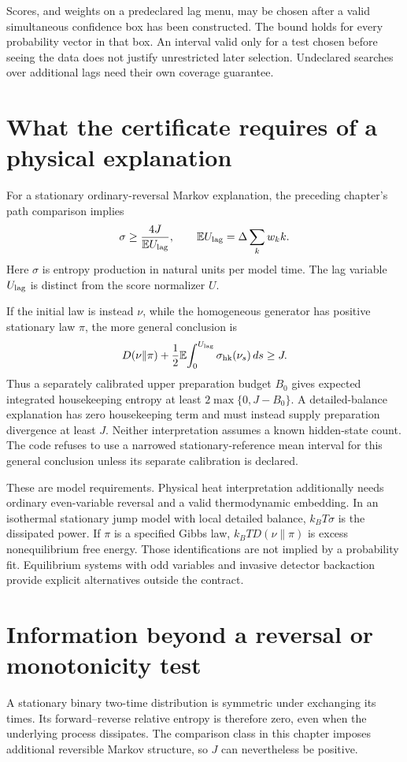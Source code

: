 Scores, and weights on a predeclared lag menu, may be chosen after a valid
simultaneous confidence box has been constructed. The bound holds for every
probability vector in that box. An interval valid only for a test chosen before
seeing the data does not justify unrestricted later selection. Undeclared
searches over additional lags need their own coverage guarantee.

\section{What the certificate requires of a physical explanation}
For a stationary ordinary-reversal Markov explanation, the preceding chapter's
path comparison implies
\begin{equation}
 \sigma\geq\frac{4J}{\mathbb E U_{\rm lag}},\qquad
 \mathbb E U_{\rm lag}=\Delta\sum_k w_k k.
 \label{rf:dual-rate}
\end{equation}
Here $\sigma$ is entropy production in natural units per model time. The lag
variable $U_{\rm lag}$ is distinct from the score normalizer $U$.

If the initial law is instead $\nu$, while the homogeneous generator has
positive stationary law $\pi$, the more general conclusion is
\begin{equation}
 D(\nu\|\pi)
 +\frac12\mathbb E\!\int_0^{U_{\rm lag}}\sigma_{\rm hk}(\nu_s)\,ds
 \geq J.
 \label{rf:dual-budget}
\end{equation}
Thus a separately calibrated upper preparation budget $B_0$ gives expected
integrated housekeeping entropy at least $2\max\{0,J-B_0\}$. A detailed-balance
explanation has zero housekeeping term and must instead supply preparation
divergence at least $J$. Neither interpretation assumes a known hidden-state
count. The code refuses to use a narrowed stationary-reference mean interval
for this general conclusion unless its separate calibration is declared.

These are model requirements. Physical heat interpretation additionally needs
ordinary even-variable reversal and a valid thermodynamic embedding. In an
isothermal stationary jump model with local detailed balance, $k_BT\sigma$ is
the dissipated power. If $\pi$ is a specified Gibbs law, $k_BT D(\nu\|\pi)$ is
excess nonequilibrium free energy. Those identifications are not implied by a
probability fit. Equilibrium systems with odd variables and invasive detector
backaction provide explicit alternatives outside the contract.

\section{Information beyond a reversal or monotonicity test}
A stationary binary two-time distribution is symmetric under exchanging its
times. Its forward--reverse relative entropy is therefore zero, even when the
underlying process dissipates. The comparison class in this chapter imposes
additional reversible Markov structure, so $J$ can nevertheless be positive.

